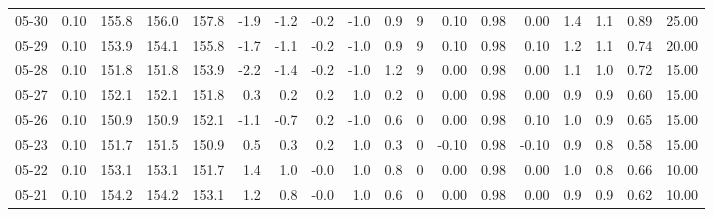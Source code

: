 \begin{threeparttable}
{\begin{tabular}{lrrrrrrrrrrrrrrrrr}
  05-30 &     0.10 & 155.8 & 156.0 & 157.8 &       -1.9 &           -1.2 &                      -0.2 &                     -1.0 &                 0.9 &              9 &       0.10 &      0.98 &           0.00 &              1.4 &                 1.1 &            0.89 &                  25.00 \\
  05-29 &     0.10 & 153.9 & 154.1 & 155.8 &       -1.7 &           -1.1 &                      -0.2 &                     -1.0 &                 0.9 &              9 &       0.10 &      0.98 &           0.10 &              1.2 &                 1.1 &            0.74 &                  20.00 \\
  05-28 &     0.10 & 151.8 & 151.8 & 153.9 &       -2.2 &           -1.4 &                      -0.2 &                     -1.0 &                 1.2 &              9 &       0.00 &      0.98 &           0.00 &              1.1 &                 1.0 &            0.72 &                  15.00 \\
  05-27 &     0.10 & 152.1 & 152.1 & 151.8 &        0.3 &            0.2 &                       0.2 &                      1.0 &                 0.2 &              0 &       0.00 &      0.98 &           0.00 &              0.9 &                 0.9 &            0.60 &                  15.00 \\
  05-26 &     0.10 & 150.9 & 150.9 & 152.1 &       -1.1 &           -0.7 &                       0.2 &                     -1.0 &                 0.6 &              0 &       0.00 &      0.98 &           0.10 &              1.0 &                 0.9 &            0.65 &                  15.00 \\
  05-23 &     0.10 & 151.7 & 151.5 & 150.9 &        0.5 &            0.3 &                       0.2 &                      1.0 &                 0.3 &              0 &      -0.10 &      0.98 &          -0.10 &              0.9 &                 0.8 &            0.58 &                  15.00 \\
  05-22 &     0.10 & 153.1 & 153.1 & 151.7 &        1.4 &            1.0 &                      -0.0 &                      1.0 &                 0.8 &              0 &       0.00 &      0.98 &           0.00 &              1.0 &                 0.8 &            0.66 &                  10.00 \\
  05-21 &     0.10 & 154.2 & 154.2 & 153.1 &        1.2 &            0.8 &                      -0.0 &                      1.0 &                 0.6 &              0 &       0.00 &      0.98 &           0.00 &              0.9 &                 0.9 &            0.62 &                  10.00 \\

\end{tabular}}
\end{threeparttable}
